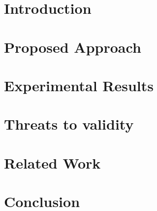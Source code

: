 	\author{
	}
	
	\maketitle	

	\begin{abstract}
		\label{sec:abstract}
		
	\end{abstract}


\section{Introduction}
\label{sec:introduction}




\section{Proposed Approach}
\label{sec:framework}


\section{Experimental Results}
\label{sec:exp_results}


\section{Threats to validity}
\label{sec:threats}



\section{Related Work}
\label{sec:relatedwork}


\section{Conclusion}
\label{sec:conclusion}


%

%

\balance

\let\oldthebibliography=\thebibliography
\let\endoldthebibliography=\endthebibliography
{\scriptsize
	
	
}


